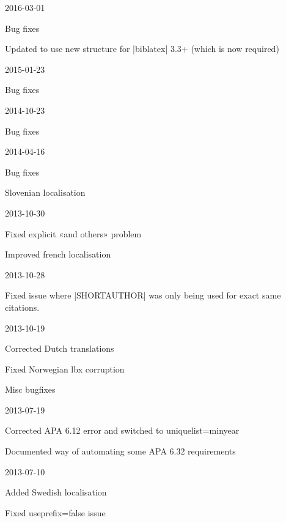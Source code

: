 \documentclass{ltxdockit}
\begin{document}
\begin{changelog}

\begin{release}{6.8}{2016-03-01}
\item Bug fixes
\item Updated to use new  structure for |biblatex|
  3.3+ (which is now required)
\end{release}

\begin{release}{6.7}{2015-01-23}
\item Bug fixes
\end{release}

\begin{release}{6.6}{2014-10-23}
\item Bug fixes
\end{release}

\begin{release}{6.5}{2014-04-16}
\item Bug fixes
\item Slovenian localisation
\end{release}

\begin{release}{6.4}{2013-10-30}
\item Fixed explicit «and others» problem
\item Improved french localisation
\end{release}

\begin{release}{6.3}{2013-10-28}
\item Fixed issue where |SHORTAUTHOR| was only being used for exact same citations.
\end{release}

\begin{release}{6.2}{2013-10-19}
\item Corrected Dutch translations
\item Fixed Norwegian lbx corruption
\item Misc bugfixes
\end{release}

\begin{release}{6.1}{2013-07-19}
\item Corrected APA 6.12 error and switched to uniquelist=minyear
\item Documented way of automating some APA 6.32 requirements
\end{release}

\begin{release}{6.0}{2013-07-10}
\item Added Swedish localisation
\item Fixed useprefix=false issue
\end{release}


\end{changelog}
\end{document}
